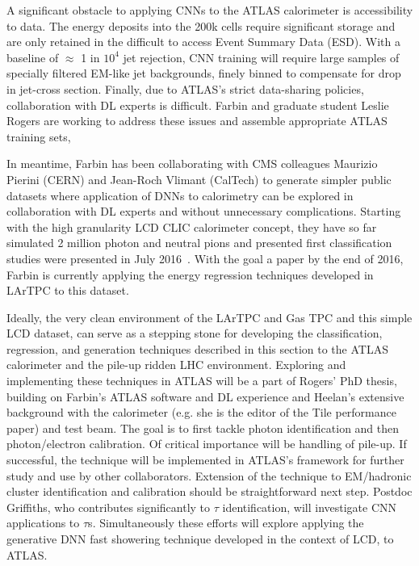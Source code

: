 A significant obstacle to applying CNNs to the ATLAS calorimeter is
accessibility to data. The energy deposits into the 200k cells require
significant storage and are only retained in the difficult to access
Event Summary Data (ESD). With a baseline of $\approx$ 1 in $10^4$ jet
rejection, CNN training will require large samples of specially
filtered EM-like jet backgrounds, finely binned to compensate for
drop in jet-cross section. Finally, due to ATLAS's strict data-sharing
policies, collaboration with DL experts is difficult. Farbin and
graduate student Leslie Rogers are working to address these issues and
assemble appropriate ATLAS training sets,

In meantime, Farbin has been collaborating with CMS colleagues
Maurizio Pierini (CERN) and Jean-Roch Vlimant (CalTech) to generate
simpler public datasets where application of DNNs to calorimetry can
be explored in collaboration with DL experts and without unnecessary
complications. Starting with the high granularity LCD CLIC calorimeter
concept, they have so far simulated 2 million photon and neutral pions
and presented first classification studies were presented in July
2016~\cite{}. With the goal a paper by the end of 2016, Farbin is
currently applying the energy regression techniques developed in
LArTPC to this dataset. 

Ideally, the very clean environment of the LArTPC and Gas TPC and this
simple LCD dataset, can serve as a stepping stone for developing the
classification, regression, and generation techniques described in
this section to the ATLAS calorimeter and the pile-up ridden LHC
environment. Exploring and implementing these techniques in ATLAS will
be a part of Rogers' PhD thesis, building on Farbin's ATLAS software
and DL experience and Heelan's extensive background with the
calorimeter (e.g. she is the editor of the Tile performance paper) and
test beam. The goal is to first tackle photon identification and then
photon/electron calibration. Of critical importance will be handling
of pile-up. If successful, the technique will be implemented in
ATLAS's framework for further study and use by other
collaborators. Extension of the technique to EM/hadronic cluster
identification and calibration should be straightforward next
step. Postdoc Griffiths, who contributes significantly to $\tau$
identification, will investigate CNN applications to
$\tau$s. Simultaneously these efforts will explore applying the
generative DNN fast showering technique developed in the context of
LCD, to ATLAS.

